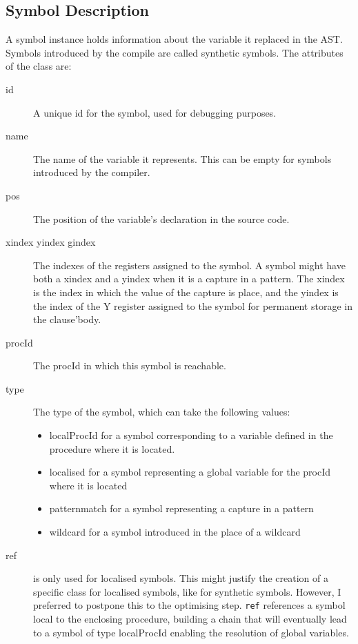 \documentclass[a4paper]{memoir}
\begin{document}
\begin{appendices}
\chapter{Symbol Description}\label{appendix:symbol}
A symbol instance holds information about the variable it replaced in the AST. Symbols introduced by the compile are called synthetic symbols.
The attributes of the class are:
\begin{description}
  \item[id] A unique id for the symbol, used for debugging purposes.
  \item[name] The name of the variable it represents. This can be empty for symbols introduced by the compiler.
  \item[pos] The position of the variable's declaration in the source code.
  \item[xindex yindex gindex] The indexes of the registers assigned to the symbol. A symbol might have both a xindex and a yindex when it is a capture in a pattern. The xindex is the index in which the value of the capture is place, and the yindex is the index of the Y register assigned to the symbol for permanent storage in the clause'body.
  \item[procId] The procId in which this symbol is reachable.
  \item[type] The type of the symbol, which can take the following values:
    \begin{itemize}
      \item localProcId for a symbol corresponding to a variable defined in the procedure where it is located.
      \item localised for a symbol representing a global variable for the procId where it is located
      \item patternmatch for a symbol representing a capture in a pattern
      \item wildcard for a symbol introduced in the place of a wildcard
    \end{itemize}
  \item[ref] is only used for localised symbols. This might justify the creation
    of a specific class for localised symbols, like for synthetic symbols.
    However, I preferred to postpone this to the optimising step. \lstinline!ref! references a symbol local to the enclosing procedure, building a chain that will eventually lead to a symbol of type localProcId enabling the resolution of global variables. %
\end{description}



\end{appendices}
\end{document}
